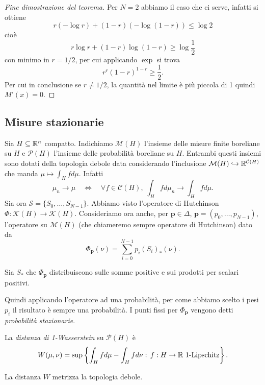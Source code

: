 \begin{proof}[Fine dimostrazione del teorema]
	Per $N=2$ abbiamo il caso che ci serve, infatti si ottiene 
	$$r(-\log r) + (1-r)(-\log (1-r)) \leq \log2$$
	cioè 
	$$r\log r + (1-r)\log(1-r)\geq\log\frac{1}{2}$$
	con minimo in $r = 1/2$, per cui applicando $\exp$ si trova
	$$r^{r}(1-r)^{1-r}\geq\frac{1}{2}.$$
	Per cui in conclusione se $r\neq1/2$, la quantità nel limite è più piccola di 1 quindi $M'(x) = 0$.
\end{proof}


\subsection{Misure stazionarie}

Sia $H\subseteq\mathbb{R}^{n}$ compatto. Indichiamo $\mathcal M(H)$ l'insieme delle misure finite boreliane su $H$ e $\mathcal P(H)$ l'insieme delle probabilità boreliane su $H$. 
Entrambi questi insiemi sono dotati della topologia debole data considerando l'inclusione $\mathcal M(H) \hookrightarrow \mathbb{R}^{\mathcal C(H)}$ che manda $\mu \mapsto \int_{H}fd\mu$. Infatti 
$$\mu_{n}\to\mu\quad\iff\quad \forall f\in\mathcal C(H),\; \int_{H}fd\mu_{n}\to\int_{H}fd\mu.$$
Sia ora $\mathcal S = \{S_{0},\dots,S_{N-1}\}$. Abbiamo visto l'operatore di Hutchinson $\Phi:\mathcal K(H)\to\mathcal K(H)$. Consideriamo ora anche, per $\mathbf p\in \Delta$, $\mathbf p = (p_{0},\dots,p_{N-1})$, l'operatore su $\mathcal M(H)$ (che chiameremo sempre operatore di Hutchinson) dato da 
$$\Phi_{\mathbf p}(\nu) = \sum_{i = 0}^{N-1} p_{i}(S_{i})_{*}(\nu).$$

\begin{esercizio}
	Sia $S_{*}$ che $\Phi_{\mathbf p}$ distribuiscono sulle somme positive e sui prodotti per scalari positivi. 
\end{esercizio}
Quindi applicando l'operatore ad una probabilità, per come abbiamo scelto i pesi $p_{i}$ il risultato è sempre una probabilità. I punti fissi per $\Phi_{\mathbf p}$ vengono detti \emph{probabilità stazionarie}.

\begin{definizione}
	La \emph{distanza di 1-Wasserstein} su $\mathcal P(H)$ è 
	$$W(\mu,\nu) = \sup\left\{\int_{H}fd\mu - \int_{H}fd\nu:\,f:H\to\mathbb{R}\text{ 1-Lipschitz}\right\}.$$
\end{definizione}

\begin{teorema}
	La distanza $W$ metrizza la topologia debole. 
\end{teorema}

